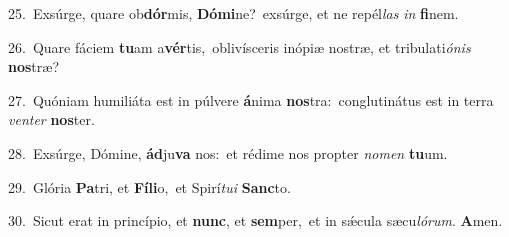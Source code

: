 {\numbfont\textcolor{\numbcolor}{25.}}~Exsúrge, quare ob\-\textbf{dór}\-mis, \textbf{Dó}\-\textbf{mi}ne?~\star exsúrge, et ne repél\textit{las} \textit{in} \textbf{fi}\-nem.\par
{\numbfont\textcolor{\numbcolor}{26.}}~Quare fáciem \textbf{tu}\-am a\-\textbf{vér}\-tis,~\star oblivísceris inópiæ nostræ, et tribulati\-\textit{ó}\-\textit{nis} \textbf{nos}\-træ?\par
{\numbfont\textcolor{\numbcolor}{27.}}~Quóniam humiliáta est in púlvere \textbf{á}\-nima \textbf{nos}\-tra:~\star conglutinátus est in terra \textit{ven}\-\textit{ter} \textbf{nos}\-ter.\par
{\numbfont\textcolor{\numbcolor}{28.}}~Exsúrge, Dómine, \textbf{ád}\-ju\textbf{va} nos:~\star et rédime nos propter \textit{no}\-\textit{men} \textbf{tu}\-um.\par
{\numbfont\textcolor{\numbcolor}{29.}}~Glória \textbf{Pa}\-tri, et \textbf{Fí}\-\textbf{li}o,~\star et Spirí\-\textit{tu}\-\textit{i} \textbf{Sanc}\-to.\par
{\numbfont\textcolor{\numbcolor}{30.}}~Sicut erat in princípio, et \textbf{nunc}\-, et \textbf{sem}\-per,~\star et in sǽcula sæcu\-\textit{ló}\-\textit{rum}. \textbf{A}\-men.\par
